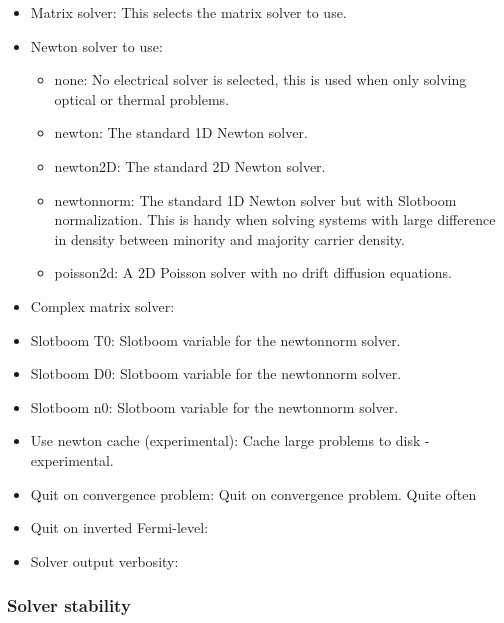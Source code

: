 \begin{itemize}
  \item Matrix solver:  This selects the matrix solver to use.
  \item Newton solver to use:
	\begin{itemize}
	  \item none: No electrical solver is selected, this is used when only solving optical or thermal problems.
	  \item newton: The standard 1D Newton solver.
	  \item newton\textunderscore 2D: The standard 2D Newton solver.
 	  \item newton\textunderscore norm: The standard 1D Newton solver but with Slotboom normalization.  This is handy when solving systems with large difference in density between minority and majority carrier density.
 	  \item poisson\textunderscore 2d: A 2D Poisson solver with no drift diffusion equations. 
	\end{itemize}
  \item Complex matrix solver:

  \item Slotboom T0: Slotboom variable for the newton\textunderscore norm solver.
  \item Slotboom D0: Slotboom variable for the newton\textunderscore norm solver.
  \item Slotboom n0: Slotboom variable for the newton\textunderscore norm solver.

  \item Use newton cache (experimental): Cache large problems to disk - experimental.
  \item Quit on convergence problem: Quit on convergence problem. Quite often 
  \item Quit on inverted Fermi-level:
  \item Solver output verbosity:

\end{itemize}

\subsubsection{Solver stability}
\label{sec:solverstability}

